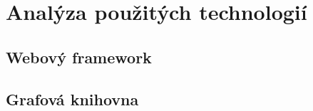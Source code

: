 \chapter{Analýza použitých technologií}
\label{chap:technologies}

\section{Webový framework}
\label{sec:web_framework}

\section{Grafová knihovna}
\label{sec:graph_library}